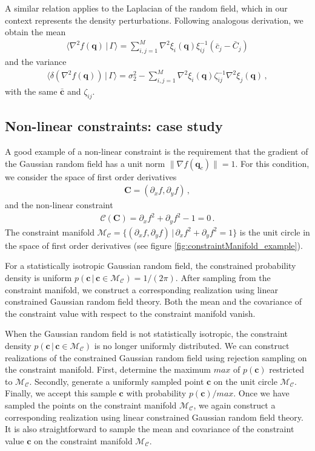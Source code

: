 \documentclass[a4paper, 11pt]{article}
\begin{document}
A similar relation applies to the Laplacian of the random field, which in our context represents the density perturbations. Following analogous derivation, we obtain the mean
\begin{align}
\langle \nabla^2 f(\bm{q})\,|\,\Gamma\rangle = \sum_{i,j=1}^M \nabla^2\xi_i(\bm{q})\xi_{ij}^{-1}(\bar{c}_j-\bar{C}_j)
\end{align}
and the variance
\begin{align}
\langle \delta (\nabla^2 f(\bm{q}))\,|\,\Gamma\rangle = \sigma_2^2 - \sum_{i,j=1}^M \nabla^2 \xi_i(\bm{q})\zeta_{ij}^{-1}\nabla^2\xi_j(\bm{q})\,,
\end{align}
with the same $\bar{\bm{c}}$ and $\zeta_{ij}$.



\subsection{Non-linear constraints: case study}
A good example of a non-linear constraint is the requirement that the gradient of the Gaussian random field has a unit norm $\|\nabla f(\bm{q}_c)\|=1$. For this condition, we consider the space of first order derivatives
\begin{align}
\bm{C}=(\partial_x f, \partial_y f)\,,
\end{align}
and the non-linear constraint 
\begin{align}
\mathcal{C}(\bm{C})=\partial_x f^2 +  \partial_y f^2 - 1=0\,.
\end{align}
The constraint manifold $\mathcal{M}_\mathcal{C}=\{(\partial_xf,\partial_yf)\, |\, \partial_xf^2+\partial_yf^2=1\}$ is the unit circle in the space of first order derivatives (see figure \ref{fig:constraintManifold_example}).

For a statistically isotropic Gaussian random field, the constrained probability density is uniform $p(\bm{c}\, |\, \bm{c}\in\mathcal{M}_\mathcal{C}) = 1/(2\pi)$. After sampling from the constraint manifold, we construct a corresponding realization using linear constrained Gaussian random field theory. Both the mean and the covariance of the constraint value with respect to the constraint manifold vanish.

When the Gaussian random field is not statistically isotropic, the constraint density $p(\bm{c}\, |\, \bm{c}\in\mathcal{M}_\mathcal{C})$ is no longer uniformly distributed. We can construct realizations of the constrained Gaussian random field using rejection sampling on the constraint manifold. First, determine the maximum $max$ of $p(\bm{c})$ restricted to $\mathcal{M}_\mathcal{C}$. Secondly, generate a uniformly sampled point $\bm{c}$ on the unit circle $\mathcal{M}_\mathcal{C}$. Finally, we accept this sample $\bm{c}$ with probability $p(\bm{c})/max$. Once we have sampled the points on the constraint manifold $\mathcal{M}_\mathcal{C}$, we again construct a corresponding realization using linear constrained Gaussian random field theory. It is also straightforward to sample the mean and covariance of the constraint value $\bm{c}$ on the constraint manifold $\mathcal{M}_\mathcal{C}$.
\end{document}
